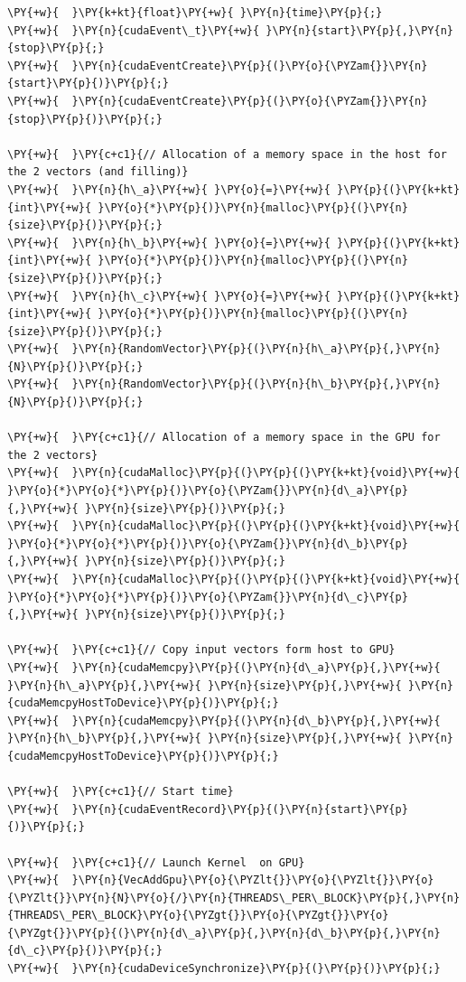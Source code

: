 \begin{Verbatim}[label=\makebox{\url{https://github.com/lucabaldini/cmepda/tree/master/slides/latex/snippets/cuda_vec_add_complete.cu}},commandchars=\\\{\}]
\PY{+w}{  }\PY{k+kt}{float}\PY{+w}{ }\PY{n}{time}\PY{p}{;}
\PY{+w}{  }\PY{n}{cudaEvent\_t}\PY{+w}{ }\PY{n}{start}\PY{p}{,}\PY{n}{stop}\PY{p}{;}
\PY{+w}{  }\PY{n}{cudaEventCreate}\PY{p}{(}\PY{o}{\PYZam{}}\PY{n}{start}\PY{p}{)}\PY{p}{;}
\PY{+w}{  }\PY{n}{cudaEventCreate}\PY{p}{(}\PY{o}{\PYZam{}}\PY{n}{stop}\PY{p}{)}\PY{p}{;}

\PY{+w}{  }\PY{c+c1}{// Allocation of a memory space in the host for the 2 vectors (and filling)}
\PY{+w}{  }\PY{n}{h\_a}\PY{+w}{ }\PY{o}{=}\PY{+w}{ }\PY{p}{(}\PY{k+kt}{int}\PY{+w}{ }\PY{o}{*}\PY{p}{)}\PY{n}{malloc}\PY{p}{(}\PY{n}{size}\PY{p}{)}\PY{p}{;}
\PY{+w}{  }\PY{n}{h\_b}\PY{+w}{ }\PY{o}{=}\PY{+w}{ }\PY{p}{(}\PY{k+kt}{int}\PY{+w}{ }\PY{o}{*}\PY{p}{)}\PY{n}{malloc}\PY{p}{(}\PY{n}{size}\PY{p}{)}\PY{p}{;}
\PY{+w}{  }\PY{n}{h\_c}\PY{+w}{ }\PY{o}{=}\PY{+w}{ }\PY{p}{(}\PY{k+kt}{int}\PY{+w}{ }\PY{o}{*}\PY{p}{)}\PY{n}{malloc}\PY{p}{(}\PY{n}{size}\PY{p}{)}\PY{p}{;}
\PY{+w}{  }\PY{n}{RandomVector}\PY{p}{(}\PY{n}{h\_a}\PY{p}{,}\PY{n}{N}\PY{p}{)}\PY{p}{;}
\PY{+w}{  }\PY{n}{RandomVector}\PY{p}{(}\PY{n}{h\_b}\PY{p}{,}\PY{n}{N}\PY{p}{)}\PY{p}{;}

\PY{+w}{  }\PY{c+c1}{// Allocation of a memory space in the GPU for the 2 vectors}
\PY{+w}{  }\PY{n}{cudaMalloc}\PY{p}{(}\PY{p}{(}\PY{k+kt}{void}\PY{+w}{ }\PY{o}{*}\PY{o}{*}\PY{p}{)}\PY{o}{\PYZam{}}\PY{n}{d\_a}\PY{p}{,}\PY{+w}{ }\PY{n}{size}\PY{p}{)}\PY{p}{;}
\PY{+w}{  }\PY{n}{cudaMalloc}\PY{p}{(}\PY{p}{(}\PY{k+kt}{void}\PY{+w}{ }\PY{o}{*}\PY{o}{*}\PY{p}{)}\PY{o}{\PYZam{}}\PY{n}{d\_b}\PY{p}{,}\PY{+w}{ }\PY{n}{size}\PY{p}{)}\PY{p}{;}
\PY{+w}{  }\PY{n}{cudaMalloc}\PY{p}{(}\PY{p}{(}\PY{k+kt}{void}\PY{+w}{ }\PY{o}{*}\PY{o}{*}\PY{p}{)}\PY{o}{\PYZam{}}\PY{n}{d\_c}\PY{p}{,}\PY{+w}{ }\PY{n}{size}\PY{p}{)}\PY{p}{;}

\PY{+w}{  }\PY{c+c1}{// Copy input vectors form host to GPU}
\PY{+w}{  }\PY{n}{cudaMemcpy}\PY{p}{(}\PY{n}{d\_a}\PY{p}{,}\PY{+w}{ }\PY{n}{h\_a}\PY{p}{,}\PY{+w}{ }\PY{n}{size}\PY{p}{,}\PY{+w}{ }\PY{n}{cudaMemcpyHostToDevice}\PY{p}{)}\PY{p}{;}
\PY{+w}{  }\PY{n}{cudaMemcpy}\PY{p}{(}\PY{n}{d\_b}\PY{p}{,}\PY{+w}{ }\PY{n}{h\_b}\PY{p}{,}\PY{+w}{ }\PY{n}{size}\PY{p}{,}\PY{+w}{ }\PY{n}{cudaMemcpyHostToDevice}\PY{p}{)}\PY{p}{;}

\PY{+w}{  }\PY{c+c1}{// Start time}
\PY{+w}{  }\PY{n}{cudaEventRecord}\PY{p}{(}\PY{n}{start}\PY{p}{)}\PY{p}{;}

\PY{+w}{  }\PY{c+c1}{// Launch Kernel  on GPU}
\PY{+w}{  }\PY{n}{VecAddGpu}\PY{o}{\PYZlt{}}\PY{o}{\PYZlt{}}\PY{o}{\PYZlt{}}\PY{n}{N}\PY{o}{/}\PY{n}{THREADS\_PER\_BLOCK}\PY{p}{,}\PY{n}{THREADS\_PER\_BLOCK}\PY{o}{\PYZgt{}}\PY{o}{\PYZgt{}}\PY{o}{\PYZgt{}}\PY{p}{(}\PY{n}{d\_a}\PY{p}{,}\PY{n}{d\_b}\PY{p}{,}\PY{n}{d\_c}\PY{p}{)}\PY{p}{;}
\PY{+w}{  }\PY{n}{cudaDeviceSynchronize}\PY{p}{(}\PY{p}{)}\PY{p}{;}


\end{Verbatim}
